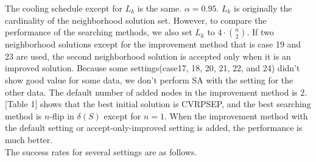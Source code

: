 \documentclass[11pt]{article}
\begin{document}
\begin{spacing}{1.5}
\noindent The cooling schedule except for $L_k$ is the same. $\alpha = 0.95$. $L_k$ is originally the cardinality of the neighborhood solution set. However, to compare the performance of the searching methods, we also set $L_k$ to $4\cdot \binom n2$.   If two neighborhood solutions except for the improvement method that is case 19 and 23 are used, the second neighborhood solution is accepted only when it is an improved solution. Because some settings(case17, 18, 20, 21, 22, and 24) didn't show good value for some data, we don't perform SA with the setting for the other data. The default number of added nodes in the improvement method is 2. [Table 1] shows that the best initial solution is CVRPSEP, and the best searching method is $n$-flip in $\delta(S)$ except for $n=1$. When the improvement method with the default setting or accept-only-improved setting is added, the performance is much better.\\
\indent The success rates for several settings are as follows.
\begin{table}[!htb]
\end{table}
\end{spacing}
\end{document}
